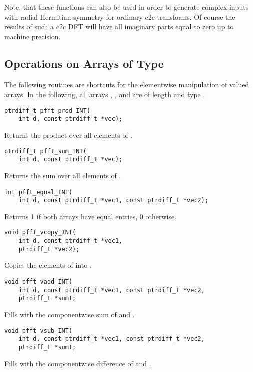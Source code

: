 Note, that these functions can also be used in order to generate complex inputs with radial Hermitian symmetry for ordinary c2c transforms. 
Of course the results of such a c2c DFT will have all imaginary parts equal to zero up to machine precision.




\subsection{Operations on Arrays of Type }
The following routines are shortcuts for the elementwise manipulation of  valued arrays.
In the following, all arrays , , and  are of length  and type .
\begin{lstlisting}
ptrdiff_t pfft_prod_INT(
    int d, const ptrdiff_t *vec);
\end{lstlisting}
Returns the product over all elements of .
\begin{lstlisting}
ptrdiff_t pfft_sum_INT(
    int d, const ptrdiff_t *vec);
\end{lstlisting}
Returns the sum over all elements of .
\begin{lstlisting}
int pfft_equal_INT(
    int d, const ptrdiff_t *vec1, const ptrdiff_t *vec2);
\end{lstlisting}
Returns 1 if both arrays have equal entries, 0 otherwise.
\begin{lstlisting}
void pfft_vcopy_INT(
    int d, const ptrdiff_t *vec1,
    ptrdiff_t *vec2);
\end{lstlisting}
Copies the elements of  into .
\begin{lstlisting}
void pfft_vadd_INT(
    int d, const ptrdiff_t *vec1, const ptrdiff_t *vec2,
    ptrdiff_t *sum);
\end{lstlisting}
Fills  with the componentwise sum of  and .
\begin{lstlisting}
void pfft_vsub_INT(
    int d, const ptrdiff_t *vec1, const ptrdiff_t *vec2,
    ptrdiff_t *sum);
\end{lstlisting}
Fills  with the componentwise difference of  and .

